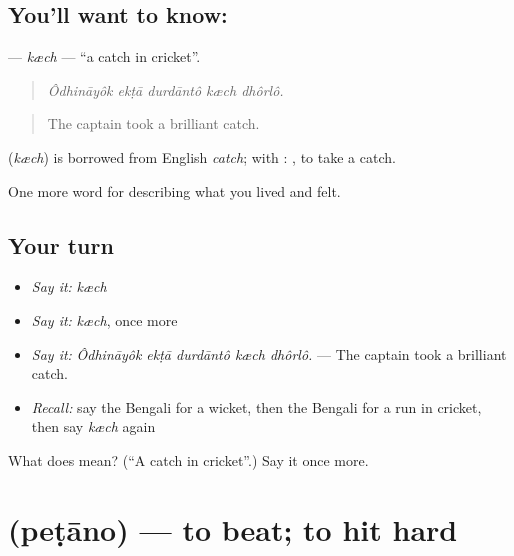 \subsection*{You'll want to know: }
\textbf{} — \emph{kæch} — \textquotedblleft{}a catch in cricket\textquotedblright{}.

\begin{quote}
    
\end{quote}

\begin{quote}
\emph{Ôdhināyôk ekṭā durdāntô kæch dhôrlô.}
\end{quote}

\begin{quote}
The captain took a brilliant catch.
\end{quote}

\begin{cousinweb}
\textbf{} (\emph{kæch}) is borrowed from English \emph{catch}; with :  , to take a catch.
\end{cousinweb}

\begin{grammarlens}[title={What you've built}]
One more word for describing what you lived and felt.
\end{grammarlens}

\subsection*{Your turn}
\begin{itemize}
\raggedright
  \item \emph{Say it:} \emph{kæch}
  \item \emph{Say it:} \emph{kæch}, once more
  \item \emph{Say it:} \emph{Ôdhināyôk ekṭā durdāntô kæch dhôrlô.} — The captain took a brilliant catch.
  \item \emph{Recall:} say the Bengali for a wicket, then the Bengali for a run in cricket, then say \emph{kæch} again
\end{itemize}

\begin{tcolorbox}[breakable,colback=teal!4,colframe=teal!35!black,title={Before you move on}]
What does  mean? (\textquotedblleft{}A catch in cricket\textquotedblright{}.) Say it once more.
\end{tcolorbox}
\section[\texorpdfstring{\bn{পেটানো} (peṭāno)}{পেটানো (peṭāno)}]{ (peṭāno) — to beat; to hit hard}

